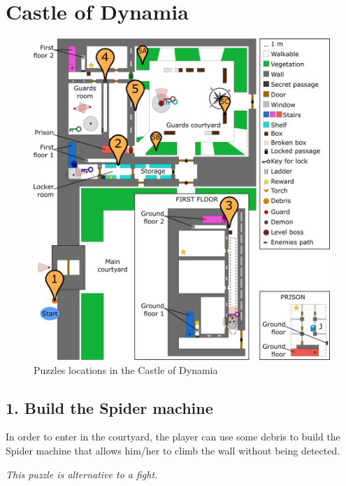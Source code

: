 \section{Castle of Dynamia}

\begin{figure}[H]
  \centering
  \includegraphics[width=\textwidth]{Images/Maps/castleOfDynamiaPuzzles}
  \caption{Puzzles locations in the Castle of Dynamia}
\end{figure}

\subsection{1. Build the Spider machine}


In order to enter in the courtyard, the player can use some debris to build the Spider machine that allows him/her to climb the wall without being detected.

\textit{This puzzle is alternative to a fight.}

